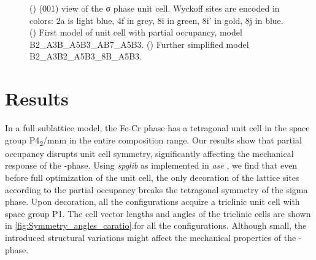\documentclass[superscriptaddress, 12pt]{revtex4-2}%
\begin{document}
\begin{figure}

  \caption{\protect\label{fig:PartialOccupancies}
    () 
    (001) view of the σ phase unit cell.
    Wyckoff sites are encoded in colors: 2a is light blue,
    4f in grey, 8i in green, 8i' in gold, 8j in blue.
    () 
    First model of unit cell with partial occupancy, model B2\_A3B\_A5B3\_AB7\_A5B3.
    () 
    Further simplified model B2\_A3B2\_A5B3\_8B\_A5B3.
  }

\end{figure}

\section{Results}

In a full sublattice model, the Fe-Cr \textsigma phase has a tetragonal unit cell in the space group P4\textsubscript{2}/mnm in the entire composition range. 
Our results show that partial occupancy disrupts unit cell symmetry, significantly affecting the mechanical response of the \textsigma-phase.
Using \textit{spglib} as implemented in \textit{ase} , we find that even before full optimization of the unit cell, the only decoration of the lattice  sites according to the partial occupancy breaks the tetragonal symmetry of the sigma phase.
Upon decoration, all the configurations acquire a triclinic unit cell with space group P1. 
The cell vector lengths and angles of the triclinic cells are shown in \autoref{fig:Symmetry_angles_caratio}.for all the configurations.
Although small, the introduced structural variations might affect the mechanical properties of the \textsigma -phase. 
\end{document}
